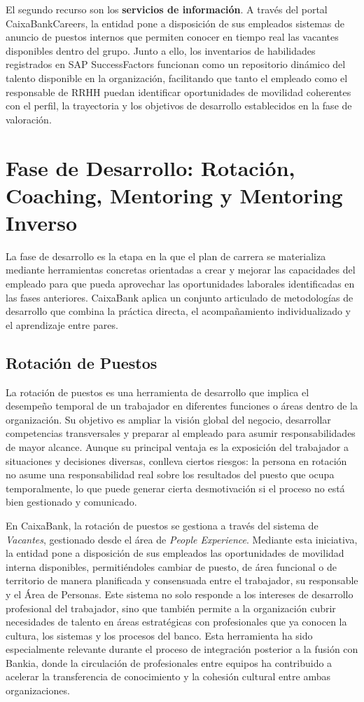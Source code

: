 El segundo recurso son los \textbf{servicios de información}. A través del portal CaixaBankCareers,
la entidad pone a disposición de sus empleados sistemas de anuncio de puestos internos que permiten
conocer en tiempo real las vacantes disponibles dentro del grupo. Junto a ello, los inventarios de
habilidades registrados en SAP SuccessFactors funcionan como un repositorio dinámico del talento
disponible en la organización, facilitando que tanto el empleado como el responsable de RRHH puedan
identificar oportunidades de movilidad coherentes con el perfil, la trayectoria y los objetivos de
desarrollo establecidos en la fase de valoración.

\section{Fase de Desarrollo: Rotación, Coaching, Mentoring y Mentoring Inverso}

La fase de desarrollo es la etapa en la que el plan de carrera se materializa mediante herramientas
concretas orientadas a crear y mejorar las capacidades del empleado para que pueda aprovechar las
oportunidades laborales identificadas en las fases anteriores. CaixaBank aplica un conjunto
articulado de metodologías de desarrollo que combina la práctica directa, el acompañamiento
individualizado y el aprendizaje entre pares.

\subsection{Rotación de Puestos}

La rotación de puestos es una herramienta de desarrollo que implica el desempeño temporal de
un trabajador en diferentes funciones o áreas dentro de la organización. Su objetivo es ampliar
la visión global del negocio, desarrollar competencias transversales y preparar al empleado
para asumir responsabilidades de mayor alcance. Aunque su principal ventaja es la exposición
del trabajador a situaciones y decisiones diversas, conlleva ciertos riesgos: la persona en
rotación no asume una responsabilidad real sobre los resultados del puesto que ocupa temporalmente,
lo que puede generar cierta desmotivación si el proceso no está bien gestionado y comunicado.

En CaixaBank, la rotación de puestos se gestiona a través del sistema de \textit{Vacantes},
gestionado desde el área de \textit{People Experience}. Mediante esta iniciativa, la entidad
pone a disposición de sus empleados las oportunidades de movilidad interna disponibles,
permitiéndoles cambiar de puesto, de área funcional o de territorio de manera planificada y
consensuada entre el trabajador, su responsable y el Área de Personas. Este sistema no solo
responde a los intereses de desarrollo profesional del trabajador, sino que también permite
a la organización cubrir necesidades de talento en áreas estratégicas con profesionales que
ya conocen la cultura, los sistemas y los procesos del banco. Esta herramienta ha sido
especialmente relevante durante el proceso de integración posterior a la fusión con Bankia, donde
la circulación de profesionales entre equipos ha contribuido a acelerar la transferencia de
conocimiento y la cohesión cultural entre ambas organizaciones.

